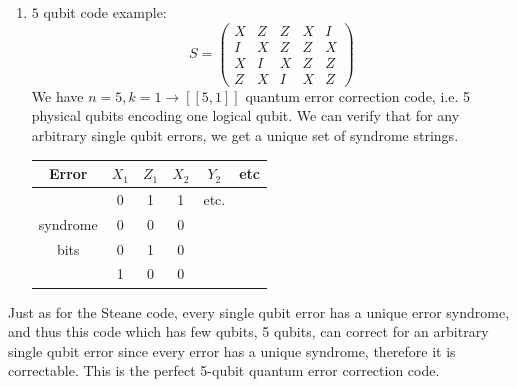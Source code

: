\begin{example}
\begin{enumerate}
        \item $5$ qubit code example:
        \begin{equation}
            S = \begin{pmatrix}
                X & Z & Z & X & I \\
                I & X & Z & Z & X \\
                X & I & X & Z & Z \\
                Z & X & I & X & Z
            \end{pmatrix}
        \end{equation}
        We have $n=5, k =1 \rightarrow [[5,1]]$ quantum error correction code, i.e. 5 physical qubits encoding one logical qubit. We can verify that for any arbitrary single qubit errors, we get a unique set of syndrome strings.
        \begin{center}
    \begin{tabular}{ c | c  c  c  c  c}
    Error & $X_1$ & $Z_1$ & $X_2$ & $Y_2$ & etc\\
    \hline
     & 0 & 1 & 1 & etc. &  \\
    syndrome & 0 & 0 & 0 & & \\
    bits & 0 & 1 & 0 & &  \\
    & 1 & 0 & 0 & & 
    \end{tabular}
    \end{center}
    \end{enumerate}
    Just as for the Steane code, every single qubit error has a unique error syndrome, and thus this code which has few qubits, 5 qubits, can correct for an arbitrary single qubit error since every error has a unique syndrome, therefore it is correctable. This is the perfect 5-qubit quantum error correction code. 
    
\end{example}




